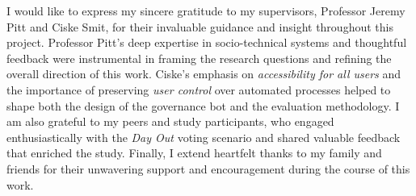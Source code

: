 I would like to express my sincere gratitude to my supervisors,  
Professor Jeremy Pitt and Ciske Smit, for their invaluable guidance and  
insight throughout this project. Professor Pitt’s deep expertise in  
socio-technical systems and thoughtful feedback were instrumental in  
framing the research questions and refining the overall direction of  
this work. Ciske’s emphasis on \emph{accessibility for all users} and  
the importance of preserving \emph{user control} over automated  
processes helped to shape both the design of the governance bot and the  
evaluation methodology. I am also grateful to my peers and study  
participants, who engaged enthusiastically with the \emph{Day Out}  
voting scenario and shared valuable feedback that enriched the study.  
Finally, I extend heartfelt thanks to my family and friends for their  
unwavering support and encouragement during the course of this work.
